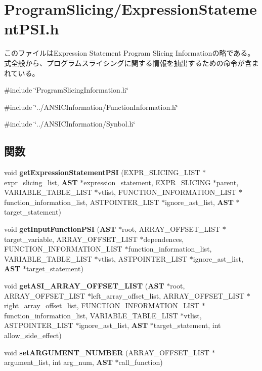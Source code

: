 \section{ProgramSlicing/ExpressionStatementPSI.h}
\label{ExpressionStatementPSI_8h}


このファイルはExpression Statement Program Slicing Informationの略である。 式全般から、プログラムスライシングに関する情報を抽出するための命令が含まれている。  


{\ttfamily \#include \char`\"{}ProgramSlicingInformation.h\char`\"{}}\par
{\ttfamily \#include \char`\"{}../ANSICInformation/FunctionInformation.h\char`\"{}}\par
{\ttfamily \#include \char`\"{}../ANSICInformation/Synbol.h\char`\"{}}\par
\subsection*{関数}
\begin{DoxyCompactItemize}
\item 
void {\bf getExpressionStatementPSI} (EXPR\_\-SLICING\_\-LIST $\ast$expr\_\-slicing\_\-list, {\bf AST} $\ast$expression\_\-statement, EXPR\_\-SLICING $\ast$parent, VARIABLE\_\-TABLE\_\-LIST $\ast$vtlist, FUNCTION\_\-INFORMATION\_\-LIST $\ast$function\_\-information\_\-list, ASTPOINTER\_\-LIST $\ast$ignore\_\-ast\_\-list, {\bf AST} $\ast$target\_\-statement)
\item 
void {\bf getInputFunctionPSI} ({\bf AST} $\ast$root, ARRAY\_\-OFFSET\_\-LIST $\ast$target\_\-variable, ARRAY\_\-OFFSET\_\-LIST $\ast$dependences, FUNCTION\_\-INFORMATION\_\-LIST $\ast$function\_\-information\_\-list, VARIABLE\_\-TABLE\_\-LIST $\ast$vtlist, ASTPOINTER\_\-LIST $\ast$ignore\_\-ast\_\-list, {\bf AST} $\ast$target\_\-statement)
\item 
void {\bf getASI\_\-ARRAY\_\-OFFSET\_\-LIST} ({\bf AST} $\ast$root, ARRAY\_\-OFFSET\_\-LIST $\ast$left\_\-array\_\-offset\_\-list, ARRAY\_\-OFFSET\_\-LIST $\ast$right\_\-array\_\-offset\_\-list, FUNCTION\_\-INFORMATION\_\-LIST $\ast$function\_\-information\_\-list, VARIABLE\_\-TABLE\_\-LIST $\ast$vtlist, ASTPOINTER\_\-LIST $\ast$ignore\_\-ast\_\-list, {\bf AST} $\ast$target\_\-statement, int allow\_\-side\_\-effect)
\item 
void {\bf setARGUMENT\_\-NUMBER} (ARRAY\_\-OFFSET\_\-LIST $\ast$argument\_\-list, int arg\_\-num, {\bf AST} $\ast$call\_\-function)
\end{DoxyCompactItemize}


